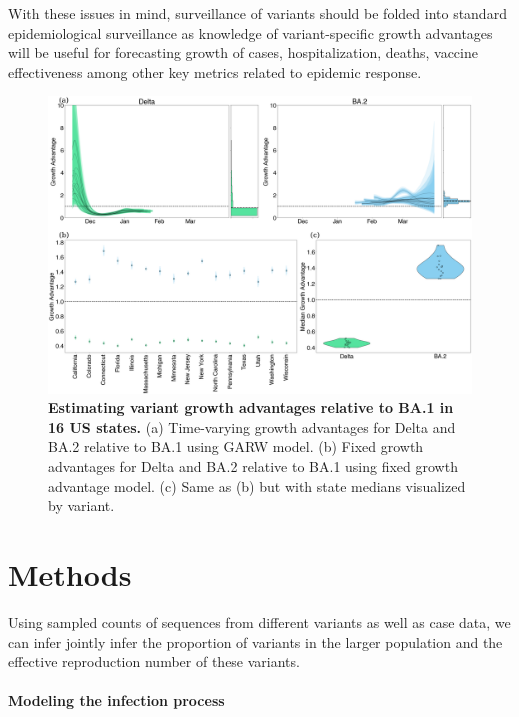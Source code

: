 \documentclass[11pt,oneside,letterpaper]{article}
\begin{document}
With these issues in mind, surveillance of variants should be folded into standard epidemiological surveillance as knowledge of variant-specific growth advantages will be useful for forecasting growth of cases, hospitalization, deaths, vaccine effectiveness among other key metrics related to epidemic response.

\begin{figure}[t]
  \centering
  \includegraphics[width=\linewidth]{figs/BA.2_growth_advantage.png}
  \caption{\textbf{Estimating variant growth advantages relative to BA.1 in 16 US states.}
    (a) Time-varying growth advantages for Delta and BA.2 relative to BA.1 using GARW model. %
    (b) Fixed growth advantages for Delta and BA.2 relative to BA.1 using fixed growth advantage model.
    (c) Same as (b) but with state medians visualized by variant.
  }
  \label{fig:BA_2_growth_advantages}
\end{figure}

\section*{Methods}

Using sampled counts of sequences from different variants as well as case data, we can infer jointly infer the proportion of variants in the larger population and the effective reproduction number of these variants.

\paragraph{Modeling the infection process}%
\end{document}

